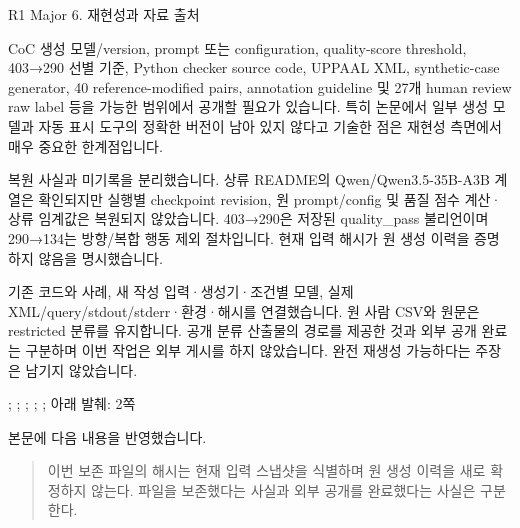 \begin{reviewitem}{R1 Major 6. 재현성과 자료 출처}

\begin{reviewercomment}

CoC 생성 모델/version, prompt 또는 configuration, quality-score threshold, 403→290 선별 기준, Python checker source code, UPPAAL XML, synthetic-case generator, 40 reference-modified pairs, annotation guideline 및 27개 human review raw label 등을 가능한 범위에서 공개할 필요가 있습니다. 특히 논문에서 일부 생성 모델과 자동 표시 도구의 정확한 버전이 남아 있지 않다고 기술한 점은 재현성 측면에서 매우 중요한 한계점입니다.

\end{reviewercomment}

\begin{authorresponse}

복원 사실과 미기록을 분리했습니다. 상류 README의 Qwen/Qwen3.5-35B-A3B 계열은 확인되지만 실행별 checkpoint revision, 원 prompt/config 및 품질 점수 계산·상류 임계값은 복원되지 않았습니다. 403→290은 저장된 quality\_pass 불리언이며 290→134는 방향/복합 행동 제외 절차입니다. 현재 입력 해시가 원 생성 이력을 증명하지 않음을 명시했습니다.

기존 코드와 사례, 새 작성 입력·생성기·조건별 모델, 실제 XML/query/stdout/stderr·환경·해시를 연결했습니다. 원 사람 CSV와 원문은 restricted 분류를 유지합니다. 공개 분류 산출물의 경로를 제공한 것과 외부 공개 완료는 구분하며 이번 작업은 외부 게시를 하지 않았습니다. 완전 재생성 가능하다는 주장은 남기지 않았습니다.

\end{authorresponse}

\begin{manuscriptrevision}{; ; ; ; ; 아래 발췌: 2쪽}

본문에 다음 내용을 반영했습니다.

\begin{quote}

이번 보존 파일의 해시는 현재 입력 스냅샷을 식별하며 원 생성 이력을 새로 확정하지 않는다. 파일을 보존했다는 사실과 외부 공개를 완료했다는 사실은 구분한다.

\end{quote}

\end{manuscriptrevision}

\end{reviewitem}

